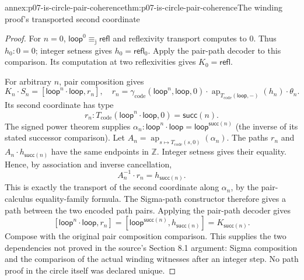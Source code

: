 \begin{annexitem}{annex:p07-is-circle-pair-coherence}{thm:p07-is-circle-pair-coherence}{The winding proof's transported second coordinate}
\begin{proof}
For \(n=0\), \(\mathsf{loop}^0\equiv_{\mathrm j}\mathsf{refl}\)
and reflexivity transport computes to \(0\).
Thus \(h_0:0=0\); integer setness gives \(h_0=\mathsf{refl}_0\).
Apply the pair-path decoder to this comparison.
Its computation at two reflexivities gives \(K_0=\mathsf{refl}\).

For arbitrary \(n\), pair composition gives
\[
K_n\cdot S_n=
 [\mathsf{loop}^n\cdot\mathsf{loop},r_n],
\quad
r_n=\gamma_{\mathrm{code}}(\mathsf{loop}^n,\mathsf{loop},0)
 \cdot\operatorname{ap}_{T_{\mathrm{code}}(\mathsf{loop},-)}(h_n)
 \cdot\theta_n.
\]
Its second coordinate has type
\[
r_n:T_{\mathrm{code}}(\mathsf{loop}^n\cdot\mathsf{loop},0)
                         =\mathsf{succ}(n).
\]
The signed power theorem supplies
\(\alpha_n:\mathsf{loop}^n\cdot\mathsf{loop}
                         =\mathsf{loop}^{\mathsf{succ}(n)}\)
(the inverse of its stated successor comparison).
Let
\(A_n=\operatorname{ap}_{s\mapsto T_{\mathrm{code}}(s,0)}(\alpha_n)\).
The paths \(r_n\) and \(A_n\cdot h_{\mathsf{succ}(n)}\)
have the same endpoints in \(\mathbb Z\).
Integer setness gives their equality. Hence, by association and
inverse cancellation,
\[
A_n^{-1}\cdot r_n=h_{\mathsf{succ}(n)}.
\]
This is exactly the transport of the second coordinate along
\(\alpha_n\), by the pair-calculus equality-family formula.
The Sigma-path constructor therefore gives a path between the
two encoded path pairs. Applying the pair-path decoder gives
\[
[\mathsf{loop}^n\cdot\mathsf{loop},r_n]
 =[\mathsf{loop}^{\mathsf{succ}(n)},h_{\mathsf{succ}(n)}]
 =K_{\mathsf{succ}(n)}.
\]
Compose with the original pair composition comparison.
This supplies the two dependencies not proved in the source's
Section 8.1 argument: Sigma composition and the comparison
of the actual winding witnesses after an integer step.
No path proof in the circle itself was declared unique.
\end{proof}
\end{annexitem}

